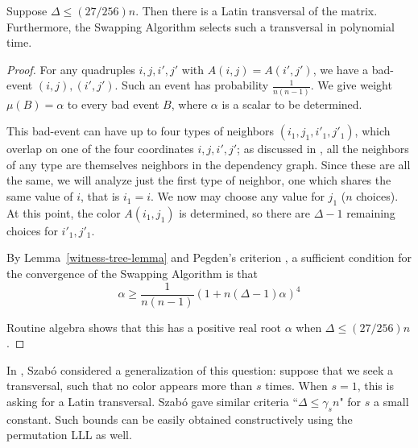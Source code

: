 \begin{theorem}
Suppose $\Delta \leq (27/256) n$. Then there is a Latin transversal of the matrix. Furthermore, the Swapping Algorithm selects such a transversal in polynomial time.
\end{theorem}
\begin{proof}
For any quadruples $i,j, i', j'$ with $A(i,j) = A(i', j')$, we have a bad-event $(i, j), (i', j')$. Such an event has probability $\tfrac{1}{n(n-1)}$. We give weight $\mu(B) = \alpha$ to every bad event $B$, where $\alpha$ is a scalar to be determined. 

This bad-event can have up to four types of neighbors $(i_1, j_1, i'_1, j'_1)$, which overlap on one of the four coordinates $i, j, i', j'$; as discussed in \cite{bissacot}, all the neighbors of any type are themselves neighbors in the dependency graph. Since these are all the same, we will analyze just the first type of neighbor, one which shares the same value of $i$, that is $i_1= i$. We now may choose any value for $j_1$ ($n$ choices). At this point, the color $A(i_1, j_1)$ is determined, so there are $\Delta-1$ remaining choices for $i'_1, j'_1$. 

By Lemma~\ref{witness-tree-lemma} and Pegden's criterion \cite{pegden}, a sufficient condition for the convergence of the Swapping Algorithm is that
$$
\alpha \geq \frac{1}{n(n-1)} (1 + n (\Delta - 1) \alpha)^4
$$

Routine algebra shows that this has a positive real root $\alpha$ when $\Delta \leq (27/256) n$.
\end{proof}

In \cite{szabo:transversals}, Szab\'{o} considered a generalization of this question: suppose that we seek a transversal, such that no color appears more than $s$ times. When $s = 1$, this is asking for a Latin transversal. Szab\'{o} gave similar criteria ``$\Delta \leq \gamma_s n$" for $s$ a small constant. Such bounds can be easily obtained constructively using the permutation LLL as well.

